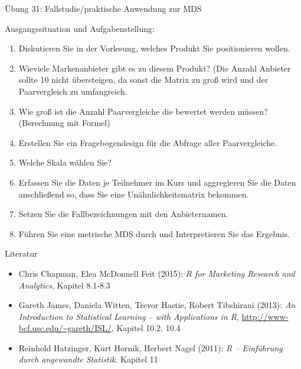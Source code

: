 \documentclass[12pt,ngerman,a4paper,ignorenonframetext,]{beamer}
\providecommand{\tightlist}{%
  \setlength{\itemsep}{0pt}\setlength{\parskip}{0pt}}
\begin{document}
\begin{frame}{Übung 31: Fallstudie/praktische Anwendung zur MDS}
\protect\hypertarget{ubung-31-fallstudiepraktische-anwendung-zur-mds}{}

Ausgangssituation und Aufgabenstellung:

\begin{enumerate}
\tightlist
\item
  Diskutieren Sie in der Vorlesung, welches Produkt Sie positionieren
  wollen.
\item
  Wieviele Markenanbieter gibt es zu diesem Produkt? (Die Anzahl
  Anbieter sollte 10 nicht übersteigen, da sonst die Matrix zu groß wird
  und der Paarvergleich zu umfangreich.
\item
  Wie groß ist die Anzahl Paarvergleiche die bewertet werden müssen?
  (Berechnung mit Formel)
\item
  Erstellen Sie ein Fragebogendesign für die Abfrage aller
  Paarvergleiche.
\item
  Welche Skala wählen Sie?
\item
  Erfassen Sie die Daten je Teilnehmer im Kurs und aggregieren Sie die
  Daten anschließend so, dass Sie eine Unähnlichkeitsmatrix bekommen.
\item
  Setzen Sie die Fallbezeichnungen mit den Anbieternamen.
\item
  Führen Sie eine metrische MDS durch und Interpretieren Sie das
  Ergebnis.
\end{enumerate}

\end{frame}

\begin{frame}{Literatur}
\protect\hypertarget{literatur-2}{}

\begin{itemize}
\tightlist
\item
  Chris Chapman, Elea McDonnell Feit (2015): \emph{R for Marketing
  Research and Analytics}, Kapitel 8.1-8.3
\item
  Gareth James, Daniela Witten, Trevor Hastie, Robert Tibshirani (2013):
  \emph{An Introduction to Statistical Learning -- with Applications in
  R}, \url{http://www-bcf.usc.edu/~gareth/ISL/}, Kapitel 10.2, 10.4
\item
  Reinhold Hatzinger, Kurt Hornik, Herbert Nagel (2011): \emph{R --
  Einführung durch angewandte Statistik}. Kapitel 11
\end{itemize}

\end{frame}
\end{document}

